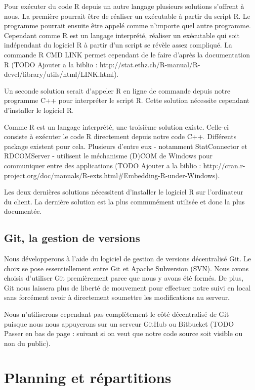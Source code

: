 	Pour exécuter du code R depuis un autre langage plusieurs solutions s’offrent à nous. La première pourrait être de réaliser un exécutable à partir du script R. Le programme pourrait ensuite être appelé comme n’importe quel autre programme. Cependant comme R est un langage interprété, réaliser un exécutable qui soit indépendant du logiciel R à partir d’un script se révèle assez compliqué. La commande R CMD LINK permet cependant de le faire d’après la documentation R (TODO Ajouter a la biblio : http://stat.ethz.ch/R-manual/R-devel/library/utils/html/LINK.html).

	Un seconde solution serait d’appeler R en ligne de commande depuis notre programme C++ pour interpréter le script R. Cette solution nécessite cependant d’installer le logiciel R.

	Comme R est un langage interprété, une troisième solution existe. Celle-ci consiste à exécuter le code R directement depuis notre code C++. Différents package existent pour cela. Plusieurs d’entre eux - notamment StatConnector et RDCOMServer - utilisent le méchanisme (D)COM de Windows pour communiquer entre des applications (TODO Ajouter a la biblio : http://cran.r-project.org/doc/manuals/R-exts.html\#Embedding-R-under-Windows).

	Les deux dernières solutions nécessitent d’installer le logiciel R sur l’ordinateur du client. La dernière solution est la plus communément utilisée et donc la plus documentée. 


\subsection{Git, la gestion de versions}
	Nous développerons à l’aide du logiciel de gestion de versions décentralisé Git. Le choix se pose essentiellement entre Git et Apache Subversion (SVN). Nous avons choisis d’utiliser Git premièrement parce que nous y avons été formés. De plus, Git nous laissera plus de liberté de mouvement pour effectuer notre suivi en local sans forcément avoir à directement soumettre les modifications au serveur.

	Nous n’utiliserons cependant pas complètement le côté décentralisé de Git puisque nous nous appuyerons sur un serveur GitHub ou Bitbucket (TODO Passer en bas de page : suivant si on veut que notre code source soit visible ou non du public).


\section{Planning et répartitions}

